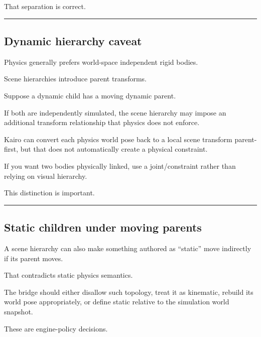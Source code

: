 That separation is correct.

\begin{center}\rule{0.5\linewidth}{0.5pt}\end{center}

\subsection{Dynamic hierarchy caveat}\label{06-engine-ii-ch038-dynamic-hierarchy-caveat}

\hypertarget{06-engine-ii-ch038-dynamic-hierarchy-caveat}{}

Physics generally prefers world-space independent rigid bodies.

Scene hierarchies introduce parent transforms.

Suppose a dynamic child has a moving dynamic parent.

If both are independently simulated, the scene hierarchy may impose an additional transform relationship that physics does not enforce.

Kairo can convert each physics world pose back to a local scene transform parent-first, but that does not automatically create a physical constraint.

If you want two bodies physically linked, use a joint/constraint rather than relying on visual hierarchy.

This distinction is important.

\begin{center}\rule{0.5\linewidth}{0.5pt}\end{center}

\subsection{Static children under moving parents}\label{06-engine-ii-ch038-static-children-under-moving-parents}

\hypertarget{06-engine-ii-ch038-static-children-under-moving-parents}{}

A scene hierarchy can also make something authored as ``static'' move indirectly if its parent moves.

That contradicts static physics semantics.

The bridge should either disallow such topology, treat it as kinematic, rebuild its world pose appropriately, or define static relative to the simulation world snapshot.

These are engine-policy decisions.

